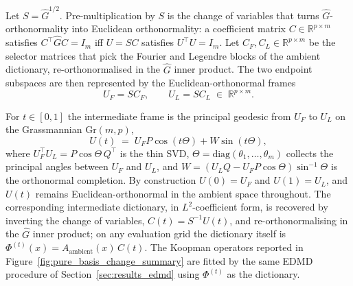 \documentclass{article}
\theoremstyle{definition}
\begin{document}
Let $S=\hat G^{1/2}$.  Pre-multiplication by $S$ is the change of variables
that turns $\hat G$-orthonormality into Euclidean orthonormality: a
coefficient matrix $C\in\mathbb R^{p\times m}$ satisfies $C^\top \hat G
C=I_m$ iff $U=SC$ satisfies $U^\top U=I_m$.  Let $C_F,C_L\in\mathbb
R^{p\times m}$ be the selector matrices that pick the Fourier and Legendre
blocks of the ambient dictionary, re-orthonormalised in the $\hat G$ inner
product.  The two endpoint subspaces are then represented by the
Euclidean-orthonormal frames
\begin{equation}\label{eq:endpoint_frames}
U_F = SC_F,\qquad U_L = SC_L \;\in\;\mathbb R^{p\times m}.
\end{equation}

For $t\in[0,1]$ the intermediate frame is the principal geodesic from
$U_F$ to $U_L$ on the Grassmannian $\mathrm{Gr}(m,p)$,
\begin{equation}\label{eq:geodesic}
U(t) \;=\; U_F P \cos(t\Theta) + W\sin(t\Theta),
\end{equation}
where $U_F^\top U_L = P\cos\Theta\,Q^\top$ is the thin SVD,
$\Theta=\mathrm{diag}(\theta_1,\ldots,\theta_m)$ collects the principal
angles between $U_F$ and $U_L$, and
$W=(U_L Q-U_F P\cos\Theta)\sin^{-1}\Theta$ is the orthonormal completion.
By construction $U(0)=U_F$ and $U(1)=U_L$, and $U(t)$ remains
Euclidean-orthonormal in the ambient space throughout.  The corresponding
intermediate dictionary, in $L^2$-coefficient form, is recovered by
inverting the change of variables, $C(t) = S^{-1}U(t)$, and re-orthonormalising
in the $\hat G$ inner product; on any evaluation grid the dictionary
itself is $\Phi^{(t)}(x) = A_{\text{ambient}}(x)\,C(t)$.  The Koopman
operators reported in Figure~\ref{fig:pure_basis_change_summary} are
fitted by the same EDMD procedure of Section~\ref{sec:results_edmd} using
$\Phi^{(t)}$ as the dictionary.
\end{document}
